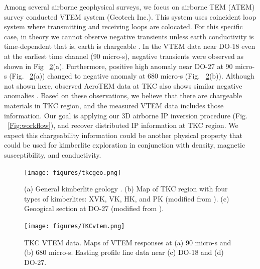 \documentclass[letterpaper,11pt]{article}
\begin{document}
Among several airborne geophysical surveys, we focus on airborne TEM (ATEM) survey conducted VTEM system (Geotech Inc.). This system uses coincident loop system where transmitting and receiving loops are colocated. For this specific case, in theory we cannot observe negative transients unless earth conductivity is time-dependent that is, earth is chargeable \cite[]{Weidelt1982}. In the VTEM data near DO-18 even at the earliest time channel (90 micro-s), negative transients were observed as shown in Fig ~\ref{Fig:TKCvtem}(a). Furthermore, positive high anomaly near DO-27 at 90 micro-s (Fig. ~\ref{Fig:TKCvtem}(a)) changed to negative anomaly at 680 micro-s (Fig. ~\ref{Fig:TKCvtem}(b)). Although not shown here, observed AeroTEM data at TKC also shows similar negative anomalies \cite[]{JansenEtAl2004}. Based on these observations, we believe that there are chargeable materials in TKC region, and the measured VTEM data includes those information. Our goal is applying our 3D airborne IP inversion procedure (Fig. ~\ref{Fig:workflow}), and recover distributed IP information at TKC region. We expect this chargeability information could be another physical property that could be used for kimberlite exploration in conjunction with density, magnetic susceptibility, and conductivity. 

\begin{figure}[htb]
  \centering
  \texttt{[image: figures/tkcgeo.png]}
  \caption{(a) General kimberlite geology \cite[]{PowerHildes2007}. (b) Map of TKC region with four types of kimberlites: XVK, VK, HK, and PK (modified from \cite{JansenEtAl2004}). (c) Geoogical section at DO-27 (modified from \cite{HarderEtAl2006}). }
  \label{Fig:tkcgeo}
\end{figure}

\begin{figure}[htb]
  \centering
  \texttt{[image: figures/TKCvtem.png]}
  \caption{TKC VTEM data. Maps of VTEM responses at (a) 90 micro-s and (b) 680 micro-s. Easting profile line data near (c) DO-18 and (d) DO-27. }
  \label{Fig:TKCvtem}
\end{figure}
\clearpage
\end{document}
